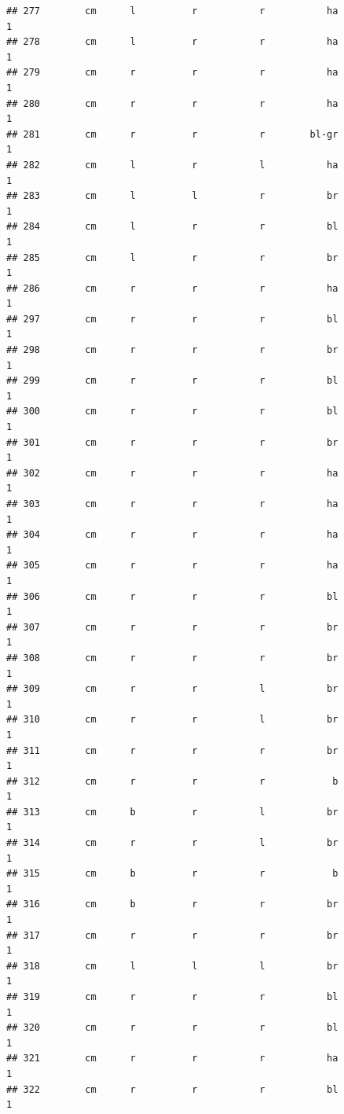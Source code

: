 \documentclass[]{article}
\begin{document}
\begin{verbatim}
## 277        cm      l          r           r           ha             1
## 278        cm      l          r           r           ha             1
## 279        cm      r          r           r           ha             1
## 280        cm      r          r           r           ha             1
## 281        cm      r          r           r        bl-gr             1
## 282        cm      l          r           l           ha             1
## 283        cm      l          l           r           br             1
## 284        cm      l          r           r           bl             1
## 285        cm      l          r           r           br             1
## 286        cm      r          r           r           ha             1
## 297        cm      r          r           r           bl             1
## 298        cm      r          r           r           br             1
## 299        cm      r          r           r           bl             1
## 300        cm      r          r           r           bl             1
## 301        cm      r          r           r           br             1
## 302        cm      r          r           r           ha             1
## 303        cm      r          r           r           ha             1
## 304        cm      r          r           r           ha             1
## 305        cm      r          r           r           ha             1
## 306        cm      r          r           r           bl             1
## 307        cm      r          r           r           br             1
## 308        cm      r          r           r           br             1
## 309        cm      r          r           l           br             1
## 310        cm      r          r           l           br             1
## 311        cm      r          r           r           br             1
## 312        cm      r          r           r            b             1
## 313        cm      b          r           l           br             1
## 314        cm      r          r           l           br             1
## 315        cm      b          r           r            b             1
## 316        cm      b          r           r           br             1
## 317        cm      r          r           r           br             1
## 318        cm      l          l           l           br             1
## 319        cm      r          r           r           bl             1
## 320        cm      r          r           r           bl             1
## 321        cm      r          r           r           ha             1
## 322        cm      r          r           r           bl             1

\end{verbatim}
\end{document}
